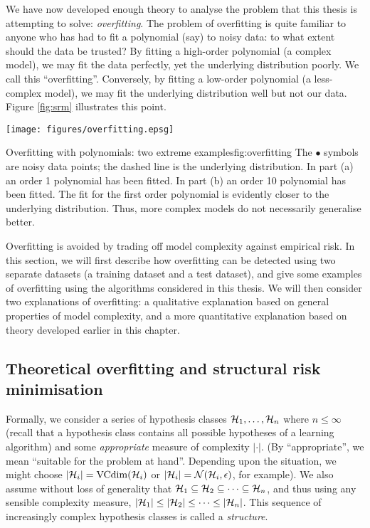 We have now developed enough theory to analyse the problem that
this thesis is attempting to solve: \emph{overfitting}.  The problem
of overfitting is quite familiar to anyone who has had to fit a
polynomial (say) to noisy data: to what extent should the data be
trusted?  By fitting a high-order polynomial (a complex model), we may
fit the data perfectly, yet the underlying distribution poorly.  We
call this ``overfitting''.  Conversely, by fitting a low-order
polynomial (a less-complex model), we may fit the underlying
distribution well but not our data.  Figure \ref{fig:srm} illustrates
this point.

\begin{linefigure}
\begin{center}
\texttt{[image: figures/overfitting.epsg]}
\end{center}
\begin{capt}{Overfitting with polynomials: two extreme
examples}{fig:overfitting}
The $\bullet$ symbols are noisy data points; the dashed line is the
underlying distribution.  In part (a) an order 1 polynomial has been
fitted.  In part (b) an order 10 polynomial has been fitted.  The fit
for the first order polynomial is evidently closer to the underlying
distribution.  Thus, more complex models do not necessarily generalise
better.
\end{capt}
\end{linefigure}

Overfitting is avoided by trading off model complexity against
empirical risk.  In this section, we will first describe how 
overfitting can be detected using two separate datasets (a training
dataset and a test dataset), and give some examples of overfitting
using the algorithms considered in this thesis.  We will then consider
two explanations of overfitting: a qualitative explanation based on
general properties of model complexity, and a more quantitative
explanation based on theory developed earlier in this chapter.


\subsection{Theoretical overfitting and structural risk minimisation}
\label{sec:theoretical overfitting}
\label{acr:srm}

Formally, we consider a series of hypothesis classes $\mathcal{H}_1, \ldots,
\mathcal{H}_n$ where $n \leq \infty$ (recall that a hypothesis class contains all
possible hypotheses of a learning algorithm) and some
\emph{appropriate} measure of complexity  $|\cdot|$.  (By
``appropriate'', we mean ``suitable for the problem at
hand''. Depending upon the situation, we might choose $|\mathcal{H}_i| =
\mathrm{VCdim}(\mathcal{H}_i)$ or $|\mathcal{H}_i| = \mathcal{N}({\mathcal{H}_i}, {\epsilon})$, for
example).  We also assume without loss of generality that $\mathcal{H}_1
\subseteq \mathcal{H}_2 \subseteq \cdots \subseteq \mathcal{H}_n$, and thus using
any sensible complexity measure, $|\mathcal{H}_1| \leq |\mathcal{H}_2| \leq \cdots
\leq |\mathcal{H}_n|$.  This sequence of increasingly complex hypothesis
classes is called a \emph{structure}.

